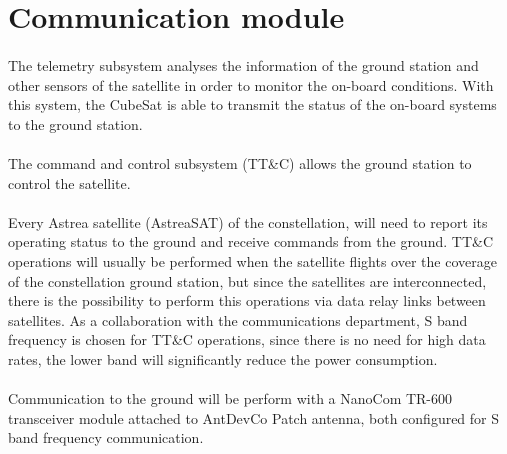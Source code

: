 \section{Communication module}



\paragraph{} The telemetry subsystem analyses the information of the ground station and other sensors of the satellite in order to monitor the on-board conditions. With this system, the CubeSat is able to transmit the status of the on-board systems to the ground station.
\paragraph{}The command and control subsystem (TT\&C) allows the ground station to control the satellite.
\paragraph{} Every Astrea satellite (AstreaSAT) of the constellation, will need to report its operating status to the ground and receive commands from the ground. TT\&C operations will usually be performed when the satellite flights over the coverage of the constellation ground station, but since the satellites are interconnected, there is the possibility to perform this operations via data relay links between satellites. As a collaboration with the communications department, S band frequency is chosen for TT\&C operations, since there is no need for high data rates, the lower band will significantly reduce the power consumption.

\paragraph{}  Communication to the ground will be perform with a NanoCom TR-600 transceiver module attached to AntDevCo Patch antenna, both configured for S band frequency communication.


